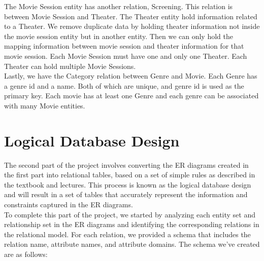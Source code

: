 \documentclass[12pt, A4, titlepage]{article}
\begin{document}
The Movie Session entity has another relation, Screening. This relation is between Movie Session and Theater. The Theater entity hold information related to a Theater. We remove duplicate data by holding theater information not inside the movie session entity but in another entity. Then we can only hold the mapping information between movie session and theater information for that movie session.  Each Movie Session must have one and only one Theater. Each Theater can hold multiple Movie Sessions. \\

Lastly, we have the Category relation between Genre and Movie. Each Genre has a genre id and a name. Both of which are unique, and genre id is used as the primary key. Each movie has at least one Genre and each genre can be associated with many Movie entities. \\

\section{Logical Database Design}

\indent \indent The second part of the project involves converting the ER diagrams created in the first part into relational tables, based on a set of simple rules as described in the textbook and lectures. This process is known as the logical database design and will result in a set of tables that accurately represent the information and constraints captured in the ER diagrams.\\

To complete this part of the project, we started by analyzing each entity set and relationship set in the ER diagrams and identifying the corresponding relations in the relational model. For each relation, we provided a schema that includes the relation name, attribute names, and attribute domains. The schema we've created are as follows: \\
\end{document}
